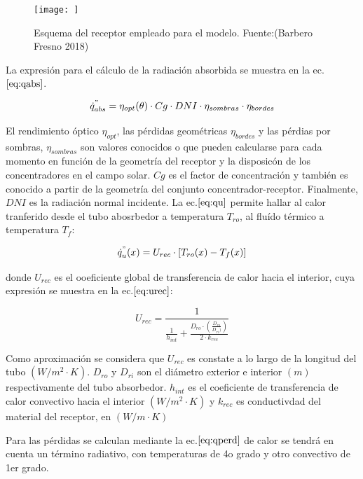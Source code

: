 \documentclass[11pt]{article}
\begin{document}
\begin{figure}    
\texttt{[image: ]}
\centering
\caption{Esquema del receptor empleado para el modelo. 
Fuente:(Barbero Fresno 2018)} 
\label{fig:receptor}
\end{figure}

La expresión para el cálculo de la radiación absorbida se muestra en la
ec.\(\eqref{eq:qabs}\).

\begin{equation}
    \dot{q}^{"}_{abs}= \eta_{opt}(\theta) \cdot Cg \cdot DNI \cdot \eta_{sombras} \cdot \eta_{bordes} \label{eq:qabs}
\end{equation}

El rendimiento óptico \(\eta_{opt}\), las pérdidas geométricas
\(\eta_{bordes}\) y las pérdias por sombras, \(\eta_{sombras}\) son
valores conocidos o que pueden calcularse para cada momento en función
de la geometría del receptor y la disposicón de los concentradores en el
campo solar. \(Cg\) es el factor de concentración y también es conocido
a partir de la geometría del conjunto concentrador-receptor. Finalmente,
\(DNI\) es la radiación normal incidente. La ec.\(\eqref{eq:qu}\)
permite hallar al calor tranferido desde el tubo abosrbedor a
temperatura \(T_{ro}\), al fluído térmico a temperatura \(T_{f}\):

\begin{equation}
    \dot{q}^{"}_{u}(x)= U_{rec} \cdot [T_{ro}(x)-T_{f}(x)] \label{eq:qu}
\end{equation}

donde \(U_{rec}\) es el ooeficiente global de transferencia de calor
hacia el interior, cuya expresión se muestra en la
ec.\(\eqref{eq:urec}\):

\begin{equation}
    U_{rec} = \frac{1}{\frac{1}{h_{int}} + \frac{D_{ro}\cdot(\frac{D_{ro}}{D_{ri})})}{2\cdot k_{rec}}} \label{eq:urec}
\end{equation}

Como aproximación se considera que \(U_{rec}\) es constate a lo largo de
la longitud del tubo \((W/m^{2}\cdot K)\). \(D_{ro}\) y \(D_{ri}\) son
el diámetro exterior e interior \((m)\) respectivamente del tubo
absorbedor. \(h_{int}\) es el coeficiente de transferencia de calor
convectivo hacia el interior \((W/m^{2}\cdot K)\) y \(k_{rec}\) es
conductivdad del material del receptor, en \((W/m\cdot K)\)

Para las pérdidas se calculan mediante la ec.\(\eqref{eq:qperd}\) de
calor se tendrá en cuenta un término radiativo, con temperaturas de 4o
grado y otro convectivo de 1er grado.
\end{document}

